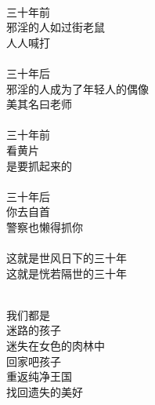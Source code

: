 \begin{poem}[三十年]
    \begin{multicols}{3}
        \begin{center}~\\
            三十年前 \\ 邪淫的人如过街老鼠 \\ 人人喊打 \\~\\
            三十年后 \\ 邪淫的人成为了年轻人的偶像 \\ 美其名曰老师 \\~\\
            三十年前 \\ 看黄片 \\ 是要抓起来的 \\~\\
            三十年后 \\ 你去自首 \\ 警察也懒得抓你 \\~\\
            这就是世风日下的三十年 \\ 这就是恍若隔世的三十年
        \end{center}
    \end{multicols}
\end{poem}

\begin{poem}[迷失肉林]
    \begin{multicols}{4}
        \begin{center}~\\
            我们都是 \\ 迷路的孩子 \\ 迷失在女色的肉林中 \\ 回家吧孩子 \\ 重返纯净王国 \\ 找回遗失的美好
        \end{center}
    \end{multicols}
\end{poem}

